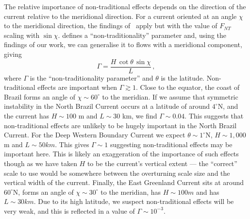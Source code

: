     The relative importance of non-traditional effects depends on the direction of the current relative to the meridional direction. For a current oriented at an angle $\chi$ to the meridional direction, the findings of~\citet{Zeitlin2018a} apply but with the value of $F_{NT}$ scaling with $\sin \chi$. \citet{Zeitlin2018a} defines a ``non-traditionality'' parameter and, using the findings of our work, we can generalise it to flows with a meridional component, giving
    \begin{equation}
        \Gamma = \frac{H\,\cot\theta\,\sin \chi}{L} \, ,
    \end{equation}
    where $\Gamma$ is the  ``non-traditionality parameter'' and $\theta$ is the latitude. Non-traditional effects are important when $\Gamma \gtrsim 1$. Close to the equator, the coast of Brazil forms an angle of $\chi \sim 60^\circ$ to the meridian. If we assume that symmetric instability in the North Brazil Current occurs at a latitude of around $4^\circ$N\footnotemark, and the current has $H\sim100$ m and $L\sim30$ km, we find $\Gamma \sim 0.04$. This suggests that non-traditional effects are unlikely to be hugely important in the North Brazil Current. For the Deep Western Boundary Current we expect $\theta \sim 1^\circ$N, $H\sim 1,000$ m and $L \sim 50 km$. This gives $\Gamma \sim 1$ suggesting non-traditional effects may be important here. This is likely an exaggeration of the importance of such effects though as we have taken $H$ to be the current's vertical extent --- the ``correct'' scale to use would be somewhere between the overturning scale size and the vertical width of the current. Finally, the East Greenland Current sits at around $60^\circ$N, forms an angle of $\chi \sim 30^\circ$ to the meridian, has $H \sim 100 m$ and has $L \sim 30 km$. Due to its high latitude, we suspect non-traditional effects will be very weak, and this is reflected in a value of $\Gamma \sim 10^{-3}$.

